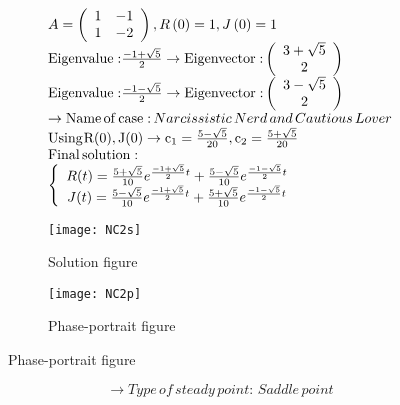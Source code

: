 \documentclass[a4paper]{article}
\begin{document}
\[\begin{array}{l}
A = \left( {\begin{array}{*{20}{c}}
1&{ - 1}\\
1&{ - 2}
\end{array}} \right),R\left( 0 \right) = 1,J\left( 0 \right) = 1\\
{\rm{Eigenvalue:}}\frac{{ - 1 + \sqrt 5 }}{2} \to {\rm{Eigenvector:}}\left( {\begin{array}{*{20}{c}}
{3 + \sqrt 5 }\\
2
\end{array}} \right)\\
{\rm{Eigenvalue:}}\frac{{ - 1 - \sqrt 5 }}{2} \to {\rm{Eigenvector:}}\left( {\begin{array}{*{20}{c}}
{3 - \sqrt 5 }\\
2
\end{array}} \right)\\
 \to {\rm{Name}}\,{\rm{of}}\,{\rm{case:}}\,Narcissistic\,Nerd\,and\,Cautious\,Lover\\
{\rm{Using}}{\mkern 1mu} {\rm{R}}({\rm{0}}),{\rm{J}}({\rm{0}}) \to {{\rm{c}}_1} = \frac{{5 - \sqrt 5 }}{{20}},{{\rm{c}}_2} = \frac{{5 + \sqrt 5 }}{{20}}\\
{\rm{Final}}\,{\rm{solution:}}\\
\left\{ {\begin{array}{*{20}{c}}
{R(t) = \frac{{5 + \sqrt 5 }}{{10}}{e^{\frac{{ - 1 + \sqrt 5 }}{2}t}} + \frac{{5 - \sqrt 5 }}{{10}}{e^{\frac{{ - 1 - \sqrt 5 }}{2}t}}}\\
{J(t) = \frac{{5 - \sqrt 5 }}{{10}}{e^{\frac{{ - 1 + \sqrt 5 }}{2}t}} + \frac{{5 + \sqrt 5 }}{{10}}{e^{\frac{{ - 1 - \sqrt 5 }}{2}t}}}
\end{array}} \right.
\end{array}\]
\begin{figure}[H]
\centering
\begin{subfigure}{.5\textwidth}
  \centering
  \texttt{[image: NC2s]}
  \caption*{Solution figure}
\end{subfigure}%
\begin{subfigure}{.5\textwidth}
  \centering
  \texttt{[image: NC2p]}
  \caption*{Phase-portrait figure}
\end{subfigure}
\end{figure}
\[  \to  Type\,of\,steady\,point:\,Saddle\,point\]
\end{document}
